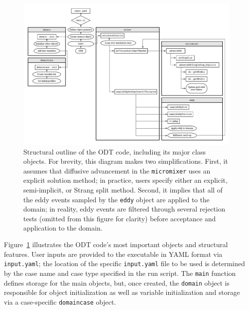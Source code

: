 \documentclass[preprint,12pt, a4paper]{elsarticle}
\begin{document}
\begin{figure}
	\begin{center}
        \includegraphics[width=\textwidth]{fig_odt_flow_chart.pdf}
	\end{center}
	\caption{Structural outline of the ODT code, including its major class objects. For brevity, this diagram makes two simplifications. First, it assumes that diffusive advancement in the \texttt{micromixer} uses an explicit solution method; in practice, users specify either an explicit, semi-implicit, or Strang split method. Second, it implies that all of the eddy events sampled by the \texttt{eddy} object are applied to the domain; in reality, eddy events are filtered through several rejection tests (omitted from this figure for clarity) before acceptance and application to the domain.}
\label{fig:flowchart}
\end{figure}

Figure~\ref{fig:flowchart} illustrates the ODT code's most important objects and structural features. User inputs are provided to the executable in YAML \cite{Beder_2008} format via \texttt{input.yaml}; the location of the specific \texttt{input.yaml} file to be used is determined by the case name and case type specified in the run script. The \texttt{main} function defines storage for the main objects, but, once created, the \texttt{domain} object is responsible for object initialization as well as variable initialization and storage via a case-specific \texttt{domaincase} object. 
\end{document}
